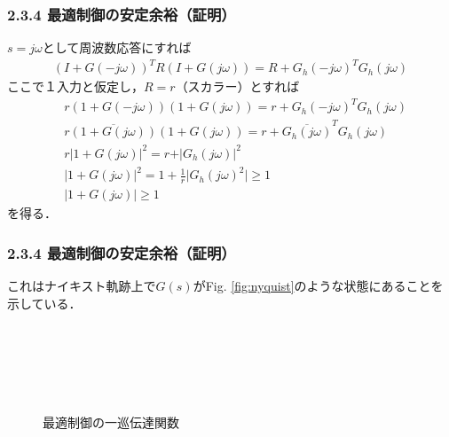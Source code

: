 \begin{frame}[t]
\frametitle{2.3.4 最適制御の安定余裕（証明）}
$s= j \omega$として周波数応答にすれば
\begin{align}
	(I+ G(-j \omega ))^T R (I + G(j \omega))
		= R + G_h(-j \omega)^T G_h(j \omega)
\nonumber
\end{align}
ここで１入力と仮定し，$R=r$（スカラー）とすれば
\begin{align}
	&
	r (1+ G(-j \omega )) (1 + G(j \omega))
		= r + G_h(-j \omega)^T G_h(j \omega)
\nonumber\\
	&
	r \overline{(1+ G(j \omega ))}(1 + G(j \omega))
		= r + \overline{G_h(j \omega)}^T G_h(j \omega)
\nonumber \\
	&
	r \vert 1 + G(j \omega) \vert^2
		= r + \vert G_h(j \omega) \vert^2
\nonumber \\
	&
	 \vert 1 + G(j \omega) \vert^2
		= 1 + \frac{1}{r} \vert G_h(j \omega)^2 \vert \geq 1
\\
	&
	 \vert 1 + G(j \omega) \vert
		\geq 1
\end{align}
を得る．
\end{frame}

\begin{frame}[t]
\frametitle{2.3.4 最適制御の安定余裕（証明）}
これはナイキスト軌跡上で$G(s)$がFig. \ref{fig:nyquist}のような状態にあることを示している．

\begin{figure}[bht]
 \begin{center}
\begin{minipage}[c]{5cm}
 \begin{center}
  \caption{最適制御のナイキスト軌跡}
  \label{fig:nyquist}
 \end{center}
\end{minipage}
\ \ \ 
\begin{minipage}[c]{5cm}
 \begin{center}
  \caption{最適制御の一巡伝達関数}
  \label{fig:nyquist_block}
 \end{center}
\end{minipage}
 \end{center}
\end{figure}

\end{frame}

